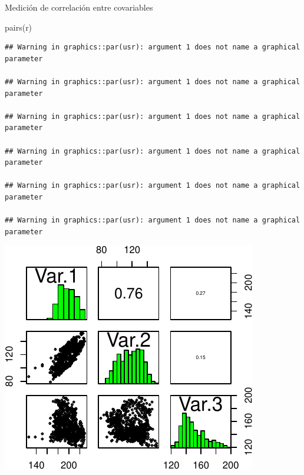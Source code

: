 \documentclass[
  11pt,
  ignorenonframetext,
]{beamer}
\newenvironment{Shaded}{}{}
\newcommand{\FunctionTok}[1]{\textcolor[rgb]{0.02,0.16,0.49}{#1}}
\newcommand{\NormalTok}[1]{#1}
\begin{document}
\begin{frame}[fragile]{Medición de correlación entre covariables}
\protect\hypertarget{mediciuxf3n-de-correlaciuxf3n-entre-covariables}{}
\begin{Shaded}
\begin{Highlighting}[]
\FunctionTok{pairs}\NormalTok{(r)}
\end{Highlighting}
\end{Shaded}

\begin{verbatim}
## Warning in graphics::par(usr): argument 1 does not name a graphical parameter

## Warning in graphics::par(usr): argument 1 does not name a graphical parameter

## Warning in graphics::par(usr): argument 1 does not name a graphical parameter

## Warning in graphics::par(usr): argument 1 does not name a graphical parameter

## Warning in graphics::par(usr): argument 1 does not name a graphical parameter

## Warning in graphics::par(usr): argument 1 does not name a graphical parameter
\end{verbatim}

\begin{center}\includegraphics{Tutorial-spatstat-2_files/figure-beamer/unnamed-chunk-13-1} \end{center}
\end{frame}
\end{document}
